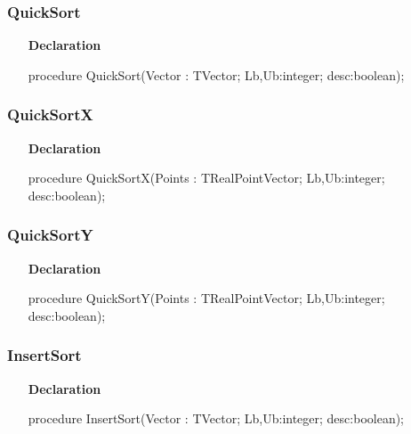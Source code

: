 \documentclass[12pt,a4paper,oneside]{report}
\newcommand{\declarationitem}[1]{\textbf{#1}}
\begin{document}
\subsubsection{QuickSort}
\label{lmsorting-QuickSort}
\begin{itemize}\item[\declarationitem{Declaration}\hfill]
	\begin{flushleft}
		\begin{ttfamily}
			procedure QuickSort(Vector : TVector; Lb,Ub:integer; desc:boolean);\end{ttfamily}
		
	\end{flushleft}
	
\end{itemize}
\subsubsection{QuickSortX}
\label{lmsorting-QuickSortX}
\begin{itemize}\item[\declarationitem{Declaration}\hfill]
	\begin{flushleft}
		\begin{ttfamily}
			procedure QuickSortX(Points : TRealPointVector; Lb,Ub:integer; desc:boolean);\end{ttfamily}
		
	\end{flushleft}
	
\end{itemize}
\subsubsection{QuickSortY}
\label{lmsorting-QuickSortY}
\begin{itemize}\item[\declarationitem{Declaration}\hfill]
	\begin{flushleft}
		\begin{ttfamily}
			procedure QuickSortY(Points : TRealPointVector; Lb,Ub:integer; desc:boolean);\end{ttfamily}
		
	\end{flushleft}
	
\end{itemize}
\subsubsection{InsertSort}
\label{lmsorting-InsertSort}
\begin{itemize}\item[\declarationitem{Declaration}\hfill]
	\begin{flushleft}
		\begin{ttfamily}
			procedure InsertSort(Vector : TVector; Lb,Ub:integer; desc:boolean);\end{ttfamily}
		
	\end{flushleft}
	
\end{itemize}
\end{document}
